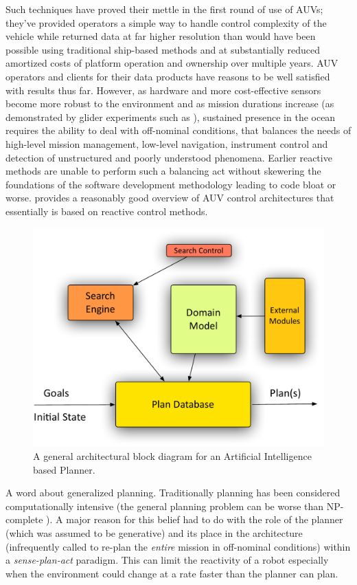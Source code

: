 Such techniques have proved their mettle in the first round of use of
AUVs; they've provided operators a simple way to handle control
complexity of the vehicle while returned data at far higher resolution
than would have been possible using traditional ship-based methods and
at substantially reduced amortized costs of platform operation and
ownership over multiple years. AUV operators and clients for their
data products have reasons to be well satisfied with results thus
far. However, as hardware and more cost-effective sensors become more
robust to the environment and as mission durations increase (as
demonstrated by glider experiments such as \cite{rucool11}), sustained
presence in the ocean requires the ability to deal with off-nominal
conditions, that balances the needs of high-level mission management,
low-level navigation, instrument control and detection of unstructured
and poorly understood phenomena. Earlier reactive methods are unable
to perform such a balancing act without skewering the foundations of
the software development methodology leading to code bloat or worse.
\cite{carreras06} provides a reasonably good overview of AUV control
architectures that essentially is based on reactive control methods.

\begin{figure}[htpb]
 \centering
 \includegraphics[scale=0.3]{figs/planner-arch.pdf}
 \caption{\small A general architectural block diagram for an
   Artificial Intelligence based Planner.}
 \label{fig:planner}
\end{figure}

A word about generalized planning. Traditionally planning has been
considered computationally intensive (the general planning problem can
be worse than NP-complete \cite{ghallab04}). A major reason for this
belief had to do with the role of the planner (which was assumed to be
generative) and its place in the architecture (infrequently called to
re-plan the \emph{entire} mission in off-nominal conditions) within a
\emph{sense-plan-act} paradigm. This can limit the reactivity of a
robot especially when the environment could change at a rate faster
than the planner can plan.  


